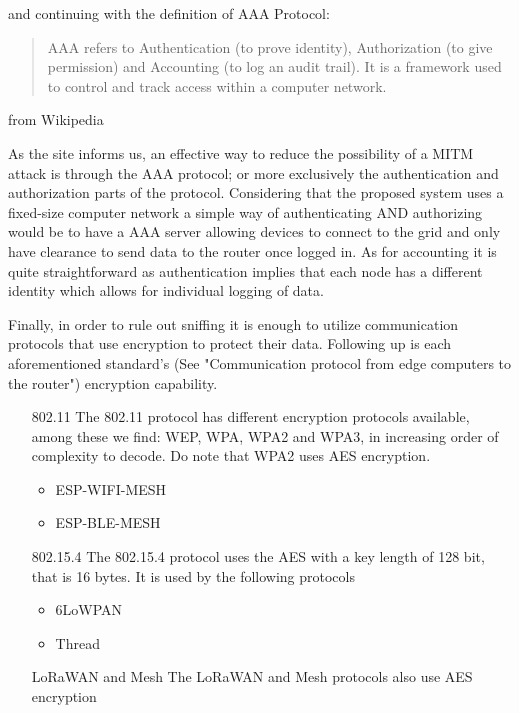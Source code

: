 \documentclass[11pt]{article}
\begin{document}
and continuing with the definition of AAA Protocol: \begin{quote}
    AAA refers to Authentication (to prove identity), Authorization (to give permission) and Accounting (to log an audit trail).
    It is a framework used to control and track access within a computer network. 
\end{quote} from Wikipedia \par \vspace{0.5 cm}

As the site informs us, an effective way to reduce the possibility of a MITM attack is through the AAA protocol; or more exclusively the authentication and authorization parts of the protocol. Considering that the proposed system uses a fixed-size computer network a simple way of authenticating AND authorizing would be to have a AAA server allowing devices to connect to the grid and only have clearance to send data to the router once logged in. As for accounting it is quite straightforward as authentication implies that each node has a different identity which allows for individual logging of data. \par \vspace{0.5 cm}

Finally, in order to rule out sniffing it is enough to utilize communication protocols that use encryption to protect their data. 
Following up is each aforementioned standard's (See "Communication protocol from edge computers to the router") encryption capability. 
\begin{itemize}
    \item [802.11]
    The 802.11 protocol has different encryption protocols available, among these we find: WEP, WPA, WPA2 and WPA3, in increasing order of complexity to decode. Do note that WPA2 uses AES encryption.
    \begin{itemize}
        \item ESP-WIFI-MESH
        \item ESP-BLE-MESH
    \end{itemize}
    \item [802.15.4]
    The 802.15.4 protocol uses the AES with a key length of 128 bit, that is 16 bytes. It is used by the following protocols
    \begin{itemize}
        \item 6LoWPAN
        \item Thread
    \end{itemize}
    \item [LoRaWAN and Mesh]
    The LoRaWAN and Mesh protocols also use AES encryption
\end{itemize}
\end{document}
